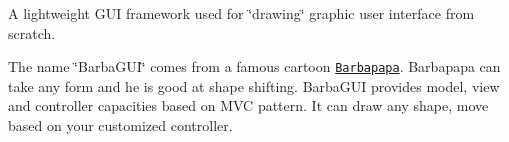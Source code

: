 A lightweight G\+UI framework used for \char`\"{}drawing\char`\"{} graphic user interface from scratch.

The name \char`\"{}\+Barba\+G\+U\+I\char`\"{} comes from a famous cartoon \href{http://www.barbapapa.com/the-barbapa-family-en/}{\tt Barbapapa}. Barbapapa can take any form and he is good at shape shifting. Barba\+G\+UI provides model, view and controller capacities based on M\+VC pattern. It can draw any shape, move based on your customized controller. 